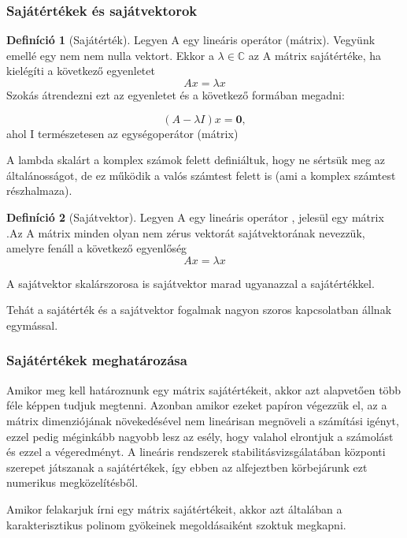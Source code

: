 \documentclass{article}
\theoremstyle{definition}
\theoremstyle{theorem}
\newtheorem{definition}{Definíció}
\begin{document}
\subsubsection{Sajátértékek és sajátvektorok}
\begin{definition}[Sajátérték]
Legyen A egy lineáris operátor (mátrix). Vegyünk emellé egy nem nem nulla vektort. Ekkor a $ \lambda \in \mathbb{C}$ az A mátrix sajátértéke, ha kielégíti a következő egyenletet
\begin{equation*}
    Ax = \lambda x
\end{equation*}
Szokás átrendezni ezt az egyenletet és a következő formában megadni:

\begin{equation*}
    (A-\lambda I)x= \textbf{0},
\end{equation*}
ahol I természetesen az egységoperátor (mátrix)
\end{definition}
A lambda skalárt a komplex számok felett definiáltuk, hogy ne sértsük meg az általánosságot, de ez működik a valós számtest felett is (ami a komplex számtest részhalmaza).
\begin{definition}[Sajátvektor]
Legyen A egy lineáris operátor , jelesül egy mátrix .Az A mátrix minden olyan nem zérus  vektorát sajátvektorának nevezzük, amelyre fenáll a következő egyenlőség
\begin{equation*}
    Ax = \lambda x
\end{equation*}
\end{definition}
A sajátvektor skalárszorosa is sajátvektor marad ugyanazzal a sajátértékkel.

Tehát a sajátérték és a sajátvektor fogalmak nagyon szoros kapcsolatban állnak egymással.

\subsubsection{Sajátértékek meghatározása}
Amikor meg kell határoznunk egy mátrix sajátértékeit, akkor azt alapvetően több féle képpen tudjuk megtenni. Azonban amikor ezeket papíron végezzük el, az a mátrix dimenziójának növekedésével nem lineárisan megnöveli a számítási igényt, ezzel pedig méginkább nagyobb lesz az esély, hogy valahol elrontjuk a számolást és ezzel a végeredményt. A lineáris rendszerek stabilitásvizsgálatában központi szerepet játszanak a sajátértékek, így ebben az alfejeztben körbejárunk ezt numerikus megközelítésből.

Amikor felakarjuk írni egy mátrix sajátértékeit, akkor azt általában a karakterisztikus polinom gyökeinek megoldásaiként szoktuk megkapni.
\end{document}
